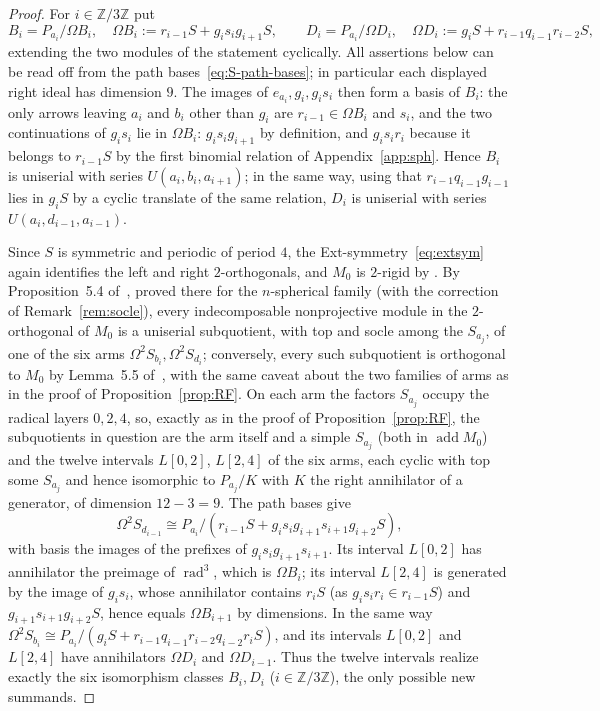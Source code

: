 \documentclass[11pt]{amsart}
\theoremstyle{plain}
\theoremstyle{definition}
\DeclareMathOperator{\rad}{rad}
\DeclareMathOperator{\add}{add}
\newcommand{\ZZ}{\mathbb{Z}}
\begin{document}
\begin{proof}
For $i\in\ZZ/3\ZZ$ put
\[
 B_i=P_{a_i}/\Omega B_i,\quad \Omega B_i:=r_{i-1}S+g_is_ig_{i+1}S,
 \qquad
 D_i=P_{a_i}/\Omega D_i,\quad \Omega D_i:=g_iS+r_{i-1}q_{i-1}r_{i-2}S,
\]
extending the two modules of the statement cyclically. All assertions below can be read off from the path
bases~\eqref{eq:S-path-bases}; in particular each displayed right ideal has dimension $9$. The images of
$e_{a_i},g_i,g_is_i$ then form a basis of $B_i$: the only arrows leaving $a_i$ and $b_i$ other than $g_i$ are
$r_{i-1}\in\Omega B_i$ and $s_i$, and the two continuations of $g_is_i$ lie in $\Omega B_i$: $g_is_ig_{i+1}$
by definition, and $g_is_ir_i$ because it belongs to $r_{i-1}S$ by the first binomial relation of
Appendix~\ref{app:sph}. Hence $B_i$ is uniserial with series $U(a_i,b_i,a_{i+1})$; in the same way, using that
$r_{i-1}q_{i-1}g_{i-1}$ lies in $g_iS$ by a cyclic translate of the same relation, $D_i$ is uniserial with
series $U(a_i,d_{i-1},a_{i-1})$.

Since $S$ is symmetric and periodic of period $4$, the Ext-symmetry~\eqref{eq:extsym} again identifies the
left and right $2$-orthogonals, and $M_0$ is $2$-rigid by \cite[Proposition~4.3]{Erdmann}. By Proposition~5.4
of~\cite{Erdmann}, proved there for the $n$-spherical family (with the correction of Remark~\ref{rem:socle}),
every indecomposable nonprojective module in the $2$-orthogonal of $M_0$ is a uniserial subquotient, with top
and socle among the $S_{a_j}$, of one of the six arms $\Omega^2S_{b_i},\Omega^2S_{d_i}$; conversely, every
such subquotient is orthogonal to $M_0$ by Lemma~5.5 of~\cite{Erdmann}, with the same caveat about the two
families of arms as in the proof of Proposition~\ref{prop:RF}. On each arm the factors $S_{a_j}$ occupy the
radical layers $0,2,4$, so, exactly as in the proof of Proposition~\ref{prop:RF}, the subquotients in question
are the arm itself and a simple $S_{a_j}$ (both in $\add M_0$) and the twelve intervals $L[0,2]$, $L[2,4]$ of
the six arms, each cyclic with top some $S_{a_j}$ and hence isomorphic to $P_{a_j}/K$ with $K$ the right
annihilator of a generator, of dimension $12-3=9$. The path bases give
\[
 \Omega^2S_{d_{i-1}}\cong P_{a_i}/(r_{i-1}S+g_is_ig_{i+1}s_{i+1}g_{i+2}S),
\]
with basis the images of the prefixes of $g_is_ig_{i+1}s_{i+1}$. Its interval $L[0,2]$ has annihilator the
preimage of $\rad^3$, which is $\Omega B_i$; its interval $L[2,4]$ is generated by the image of $g_is_i$,
whose annihilator contains $r_iS$ (as $g_is_ir_i\in r_{i-1}S$) and $g_{i+1}s_{i+1}g_{i+2}S$, hence equals
$\Omega B_{i+1}$ by dimensions. In the same way $\Omega^2S_{b_i}\cong
P_{a_i}/(g_iS+r_{i-1}q_{i-1}r_{i-2}q_{i-2}r_iS)$, and its intervals $L[0,2]$ and $L[2,4]$ have annihilators
$\Omega D_i$ and $\Omega D_{i-1}$. Thus the twelve intervals realize exactly the six isomorphism classes
$B_i,D_i$ ($i\in\ZZ/3\ZZ$), the only possible new summands.


\end{proof}
\end{document}
